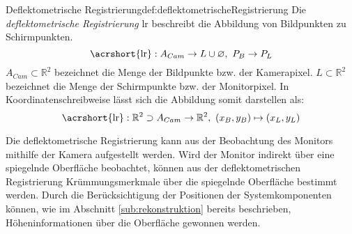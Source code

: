 \begin{Definition}{Deflektometrische Registrierung}{def:deflektometrischeRegistrierung}
	Die \textit{deflektometrische Registrierung} \acrshort{lr} beschreibt die Abbildung von Bildpunkten zu Schirmpunkten. \cite{kit_sbw}
	\begin{equation}
		\text{\acrshort{lr}} : A_{Cam} \rightarrow L \cup \varnothing ,~ P_{B} \rightarrow P_{L}
	\end{equation}
	$ A_{Cam} \subset \mathbb{R}^{2} $ bezeichnet die Menge der Bildpunkte bzw. der Kamerapixel.
	$ L \subset \mathbb{R}^{2} $ bezeichnet die Menge der Schirmpunkte bzw. der Monitorpixel.
	In Koordinatenschreibweise lässt sich die Abbildung somit darstellen als:
	\begin{equation} \label{eq:deflektometrischeRegistrierung}
		\text{\acrshort{lr}} : \mathbb{R}^{2} \supset A_{Cam} \rightarrow \mathbb{R}^2 ,~ (x_{B}, y_{B}) \mapsto (x_{L}, y_{L})
	\end{equation}
\end{Definition}

\noindent
Die deflektometrische Registrierung kann aus der Beobachtung des Monitors mithilfe der Kamera aufgestellt werden.
Wird der Monitor indirekt über eine spiegelnde Oberfläche beobachtet, können aus der deflektometrischen Registrierung Krümmungsmerkmale über die spiegelnde Oberfläche bestimmt werden.
Durch die Berücksichtigung der Positionen der Systemkomponenten können, wie im Abschnitt \ref{sub:rekonstruktion} bereits beschrieben, Höheninformationen über die Oberfläche gewonnen werden.
